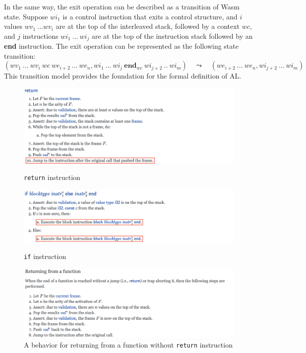 In the same way, the exit operation can be described as a transition of Wasm
state.
Suppose $wi_1$ is a control instruction that exits a control structure, and $i$
values $wv_1 ~ ... wv_i$ are at the top of the interleaved stack, followed by a
context $wc$, and $j$ instructions $wi_1 ~ ... ~ wi_j$ are at the top of the
instruction stack followed by an \textbf{end} instruction.
The exit operation can be represented as the following state transition:
\[
(wv_1 ~ ... ~ wv_i ~ wc ~ we_{i+2} ~ ...  ~ we_n,
  wi_1 ~ ... ~ wi_j ~ \textbf{end}_{wc} ~ wi_{j+2} ~ ..  ~ wi_m)
  \quad\leadsto\quad
  (we_{i+2} ~ ... ~ we_n, wi_{j+2} ~ ... ~ wi_m)
\]
This transition model provides the foundation for the formal definition of AL.

\newpage

\begin{figure}[h]
  \centerline{\includegraphics[width=15cm]{fig/return}}
  \caption[\texttt{return} instruction]{\texttt{return} instruction}
    \label{fig:return}
  \centerline{\includegraphics[width=15cm]{fig/if}}
  \caption[\texttt{if} instruction]{\texttt{if} instruction}
    \label{fig:if}
  \centerline{\includegraphics[width=15cm]{fig/returning}}
  \caption[A behavior for returning from a function without \texttt{return} instruction]
    {A behavior for returning from a function without \texttt{return} instruction}
    \label{fig:exiting-label}
\end{figure}





